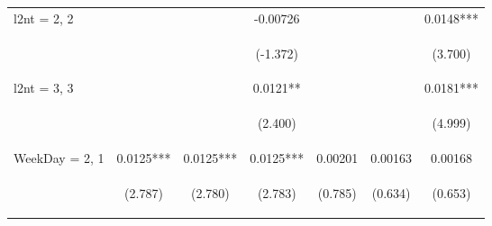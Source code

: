 \documentclass[]{article}
\begin{document}
\begin{center}
\begin{tabular}{lcccccc}
l2nt = 2, 2 &  &  & -0.00726 &  &  & 0.0148*** \\
\vspace{4pt} & \begin{footnotesize}\end{footnotesize} & \begin{footnotesize}\end{footnotesize} & \begin{footnotesize}(-1.372)\end{footnotesize} & \begin{footnotesize}\end{footnotesize} & \begin{footnotesize}\end{footnotesize} & \begin{footnotesize}(3.700)\end{footnotesize} \\
l2nt = 3, 3 &  &  & 0.0121** &  &  & 0.0181*** \\
\vspace{4pt} & \begin{footnotesize}\end{footnotesize} & \begin{footnotesize}\end{footnotesize} & \begin{footnotesize}(2.400)\end{footnotesize} & \begin{footnotesize}\end{footnotesize} & \begin{footnotesize}\end{footnotesize} & \begin{footnotesize}(4.999)\end{footnotesize} \\
WeekDay = 2, 1 & 0.0125*** & 0.0125*** & 0.0125*** & 0.00201 & 0.00163 & 0.00168 \\
\vspace{4pt} & \begin{footnotesize}(2.787)\end{footnotesize} & \begin{footnotesize}(2.780)\end{footnotesize} & \begin{footnotesize}(2.783)\end{footnotesize} & \begin{footnotesize}(0.785)\end{footnotesize} & \begin{footnotesize}(0.634)\end{footnotesize} & \begin{footnotesize}(0.653)\end{footnotesize} \\

\end{tabular}
\end{center}
\end{document}
